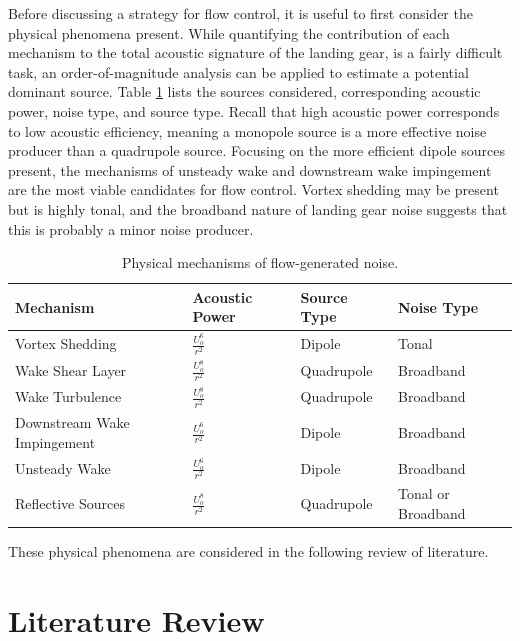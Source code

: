 Before discussing a strategy for flow control, it is useful to first consider the physical phenomena present. While quantifying the contribution of each mechanism to the total acoustic signature of the landing gear, is a fairly difficult task, an order-of-magnitude analysis can be applied to estimate a potential dominant source. Table \ref{tab:source} lists the sources considered, corresponding acoustic power, noise type, and source type. Recall that high acoustic power corresponds to low acoustic efficiency, meaning a monopole source is a more effective noise producer than a quadrupole source. Focusing on the more efficient dipole sources present, the mechanisms of unsteady wake and downstream wake impingement are the most viable candidates for flow control. Vortex shedding may be present but is highly tonal, and the broadband nature of landing gear noise suggests that this is probably a minor noise producer.

\begin{table}
 \setlength{\capwidth}{0.7\textwidth}
\begin{center}
\caption{Physical mechanisms of flow-generated noise.}
\label{tab:source}
\begin{tabular}{llll}\toprule
\parbox{0.15\linewidth}{Mechanism} & 
\parbox{0.15\linewidth}{Acoustic Power} & 
\parbox{0.15\linewidth}{Source Type} & 
\parbox{0.15\linewidth}{Noise Type} \\ \midrule
Vortex Shedding & $\frac{U_o^6}{r^2}$ & Dipole & Tonal  \\
Wake Shear Layer & $\frac{U_o^8}{r^2}$ & Quadrupole & Broadband \\
Wake Turbulence & $\frac{U_o^8}{r^2}$ & Quadrupole & Broadband \\
Downstream Wake Impingement & $\frac{U_o^6}{r^2}$ & Dipole & Broadband \\
Unsteady Wake & $\frac{U_o^6}{r^2}$ & Dipole & Broadband \\
Reflective Sources & $\frac{U_o^8}{r^2}$ & Quadrupole & Tonal or Broadband \\ \bottomrule
\end{tabular}
\end{center}
\end{table}


These physical phenomena are considered in the following review of literature.

\section{Literature Review}

